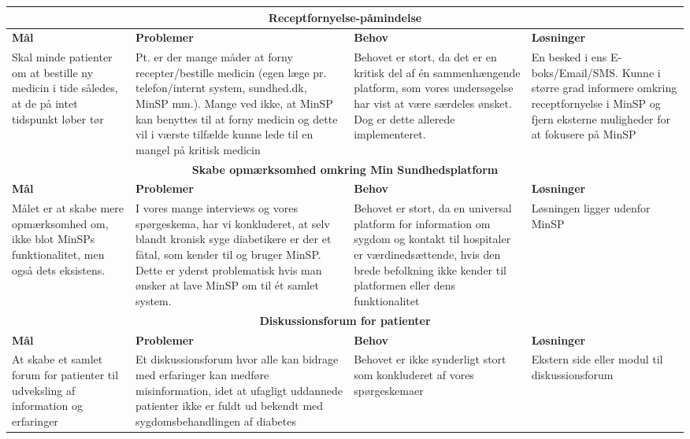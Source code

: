 \newpage

\begin{tabularx}{\textwidth}{|X|X|X|X|}
	\hline
	\multicolumn{4}{|c|}{\textbf{Receptfornyelse-påmindelse}}\\
	\hline
	\textbf{Mål} & \textbf{Problemer} & \textbf{Behov} & \textbf{Løsninger}\\
	\hline
	Skal minde patienter om at bestille ny medicin i tide således, at de på intet tidspunkt løber tør&
	Pt. er der mange måder at forny recepter/bestille medicin (egen læge pr. telefon/internt system, sundhed.dk, MinSP mm.). Mange ved ikke, at MinSP kan benyttes til at forny medicin og dette vil i værste tilfælde kunne lede til en mangel på kritisk medicin&
	Behovet er stort, da det er en kritisk del af én sammenhængende platform, som vores undersøgelse har vist at være særdeles ønsket. Dog er dette allerede implementeret.&
	En besked i ens E-boks/Email/SMS. Kunne i større grad informere omkring receptfornyelse i MinSP og fjern eksterne muligheder for at fokusere på MinSP\\
	\hline
	\multicolumn{4}{|c|}{\textbf{Skabe opmærksomhed omkring Min Sundhedsplatform}}\\
	\hline
	\textbf{Mål} & \textbf{Problemer} & \textbf{Behov} & \textbf{Løsninger}\\
	\hline
	Målet er at skabe mere opmærksomhed om, ikke blot MinSPs funktionalitet, men også dets eksistens.&
	I vores mange interviews og vores spørgeskema, har vi konkluderet, at selv blandt kronisk syge diabetikere er der et fåtal, som kender til og bruger MinSP. Dette er yderst problematisk hvis man ønsker at lave MinSP om til ét samlet system.&
	Behovet er stort, da en universal platform for information om sygdom og kontakt til hospitaler er værdinedsættende, hvis den brede befolkning ikke kender til platformen eller dens funktionalitet&
	Løsningen ligger udenfor MinSP\\
	\hline
	\multicolumn{4}{|c|}{\textbf{Diskussionsforum for patienter}}\\
	\hline
	\textbf{Mål} & \textbf{Problemer} & \textbf{Behov} & \textbf{Løsninger}\\
	\hline
	At skabe et samlet forum for patienter til udveksling af information og erfaringer&
	Et diskussionsforum hvor alle kan bidrage med erfaringer kan medføre misinformation, idet at ufagligt uddannede patienter ikke er fuldt ud bekendt med sygdomsbehandlingen af diabetes&
	Behovet er ikke synderligt stort som konkluderet af vores spørgeskemaer&
	Ekstern side eller modul til diskussionsforum\\
	\hline
\end{tabularx}
